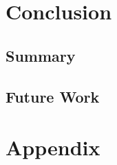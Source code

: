 \documentclass[12pt]{article}
\begin{document}

\section{Conclusion} %
\label{sec:conclusion}


	\subsection {Summary}
	\subsection {Future Work}


\section{Appendix} %



\end{document}
